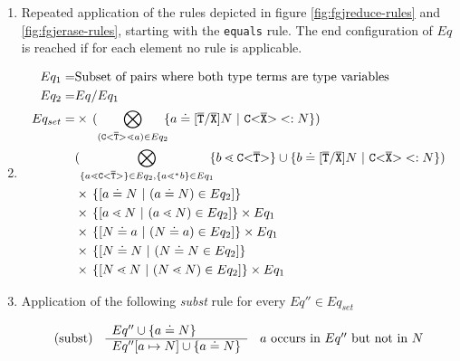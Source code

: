 \begin{enumerate}
\item Repeated application of the rules depicted in figure \ref{fig:fgjreduce-rules} and \ref{fig:fgjerase-rules},
starting with the \texttt{equals} rule.
The end configuration of $Eq$ is reached if for each element no rule is applicable.
\item
\begin{align*}
Eq_1 =& \text{Subset of pairs where both type terms are type variables}\\
Eq_2 =& Eq / Eq_1 \\
Eq_{set}
    = 
    & \times\, 
    (\displaystyle{\bigotimes_{(\mathtt{C {\tt <} \overline{T} {\tt >} } \lessdot a) \in Eq_2}}\!\!
    \{ a \doteq [\overline{\tt T}/\overline{\tt X}]N \ | \ \mathtt{C {\tt <} \overline{X} {\tt >} } <: N  \})\\
    & (\displaystyle{\bigotimes_{\{ a \lessdot \mathtt{C {\tt <} \overline{T} {\tt >} } \}  \in Eq_2, \{  a \lessdot^* b \}  \in Eq_1}}\!\!
    \{  b \lessdot \mathtt{C {\tt <} \overline{\tt T} {\tt >} } \} \cup \{ b \doteq [\overline{\tt T}/\overline{\tt X}]N \ | \ \mathtt{C {\tt <} \overline{X} {\tt >} } <: N  \})\\
    & \times\, \{ [a \doteq N \ | \  (a \doteq N) \in Eq_2] \} \\
    & \times\, \{ [a \lessdot N \ | \  (a \lessdot N) \in Eq_2] \} \times Eq_1 \\
    & \times\, \{ [N \doteq a \ | \  (N \doteq a) \in Eq_2] \} \times Eq_1 \\
    & \times\, \{ [N \doteq N \ | \  (N \doteq N \in Eq_2] \} \\
    & \times\, \{ [N \lessdot N \ | \  (N \lessdot N) \in Eq_2] \} \times Eq_1 \\
\end{align*}
\item \label{subst-step}  Application of the following \emph{subst} rule for every $Eq'' \in Eq_{set}$
    
      $$\begin{array}[c]{lll}
        (\mathrm{subst}) &
        \begin{array}[c]{l}
          Eq'' \cup \{ a \doteq N \}\\
          \hline
          Eq''[a \mapsto N] \cup \{ a \doteq N \}
        \end{array}
        & a \textrm{ occurs in } Eq'' \textrm{ but not in } N
      \end{array}$$
      

\end{enumerate}
